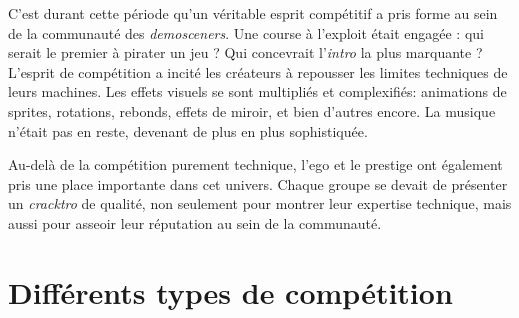 C'est durant cette période qu'un véritable esprit compétitif a pris forme au sein de la communauté des \textit{demosceners}. Une course à l'exploit était engagée : qui serait le premier à pirater un jeu ? Qui concevrait l'\textit{intro} la plus marquante ? L'esprit de compétition a incité les créateurs à repousser les limites techniques de leurs machines. Les effets visuels se sont multipliés et complexifiés: animations de sprites, rotations, rebonds, effets de miroir, et bien d'autres encore. La musique n'était pas en reste, devenant de plus en plus sophistiquée.


Au-delà de la compétition purement technique, l'ego et le prestige ont également pris une place importante dans cet univers. Chaque groupe se devait de présenter un \textit{cracktro} de qualité, non seulement pour montrer leur expertise technique, mais aussi pour asseoir leur réputation au sein de la communauté.

\newpage
\section{Différents types de compétition}

